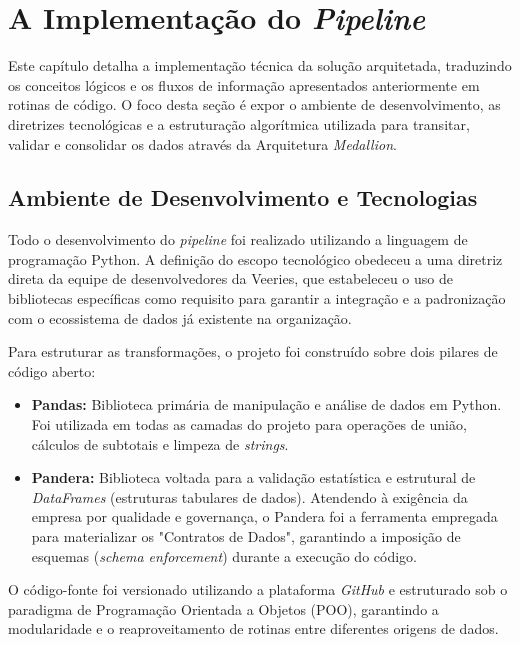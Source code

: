 \chapter{A Implementação do \textit{Pipeline}}

Este capítulo detalha a implementação técnica da solução arquitetada, traduzindo os conceitos lógicos e os fluxos de informação apresentados anteriormente em rotinas de código. O foco desta seção é expor o ambiente de desenvolvimento, as diretrizes tecnológicas e a estruturação algorítmica utilizada para transitar, validar e consolidar os dados através da Arquitetura \textit{Medallion}.

\section{Ambiente de Desenvolvimento e Tecnologias}

Todo o desenvolvimento do \textit{pipeline} foi realizado utilizando a linguagem de programação Python. A definição do escopo tecnológico obedeceu a uma diretriz direta da equipe de desenvolvedores da Veeries, que estabeleceu o uso de bibliotecas específicas como requisito para garantir a integração e a padronização com o ecossistema de dados já existente na organização. 

Para estruturar as transformações, o projeto foi construído sobre dois pilares de código aberto:
\begin{itemize}
    \item \textbf{Pandas:} Biblioteca primária de manipulação e análise de dados em Python. Foi utilizada em todas as camadas do projeto para operações de união, cálculos de subtotais e limpeza de \textit{strings}.
    \item \textbf{Pandera:} Biblioteca voltada para a validação estatística e estrutural de \textit{DataFrames} (estruturas tabulares de dados). Atendendo à exigência da empresa por qualidade e governança, o Pandera foi a ferramenta empregada para materializar os "Contratos de Dados", garantindo a imposição de esquemas (\textit{schema enforcement}) durante a execução do código.
\end{itemize}

O código-fonte foi versionado utilizando a plataforma \textit{GitHub} e estruturado sob o paradigma de Programação Orientada a Objetos (POO), garantindo a modularidade e o reaproveitamento de rotinas entre diferentes origens de dados.

